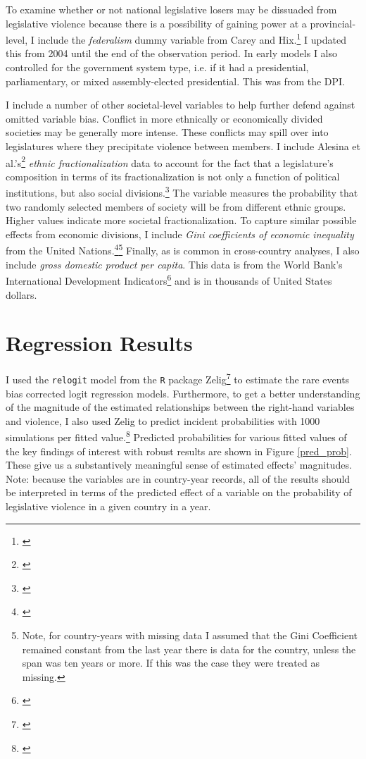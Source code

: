 \documentclass[a4paper]{article}\usepackage[]{graphicx}\usepackage[]{color}
\begin{document}
To examine whether or not national legislative losers may be dissuaded from legislative violence because there is a possibility of gaining power at a provincial-level, I include the \emph{federalism} dummy variable from Carey and Hix.\footnote{\citealt{Carey2011}} I updated this from 2004 until the end of the observation period. In early models I also controlled for the government system type, i.e. if it had a presidential, parliamentary, or mixed assembly-elected presidential. This was from the DPI.

I include a number of other societal-level variables to help further defend against omitted variable bias. Conflict in more ethnically or economically divided societies may be generally more intense. These conflicts may spill over into legislatures where they precipitate violence between members. I include Alesina et al.'s\footnote{\citealt{Alesina2003}} {\emph{ethnic fractionalization}} data to account for the fact that a legislature's composition in terms of its fractionalization is not only a function of political institutions, but also social divisions.\footnote{\citealt{Neto1997, Mozaffar2003}} The variable measures the probability that two randomly selected members of society will be from different ethnic groups. Higher values indicate more societal fractionalization. To capture similar possible effects from economic divisions, I include {\emph{Gini coefficients of economic inequality}} from the United Nations.\footnote{\citealt{UNU2008}}\footnote{Note, for country-years with missing data I assumed that the Gini Coefficient remained constant from the last year there is data for the country, unless the span was ten years or more. If this was the case they were treated as missing.} Finally, as is common in cross-country analyses, I also include {\emph{gross domestic product per capita}}. This data is from the World Bank's International Development Indicators\footnote{\citealt{WorldBank2011}} and is in thousands of United States dollars.



\section{Regression Results}

I used the {\tt{relogit}} model from the {\tt{R}} package Zelig\footnote{\citealt{IMAIKingZelig2008}} to estimate the rare events bias corrected logit regression models. Furthermore, to get a better understanding of the magnitude of the estimated relationships between the right-hand variables and violence, I also used Zelig to predict incident probabilities with 1000 simulations per fitted value.\footnote{\citealt{King2002}} Predicted probabilities for various fitted values of the key findings of interest with robust results are shown in Figure \ref{pred_prob}. These give us a substantively meaningful sense of estimated effects' magnitudes. Note: because the variables are in country-year records, all of the results should be interpreted in terms of the predicted effect of a variable on the probability of legislative violence in a given country in a year. 
\end{document}
